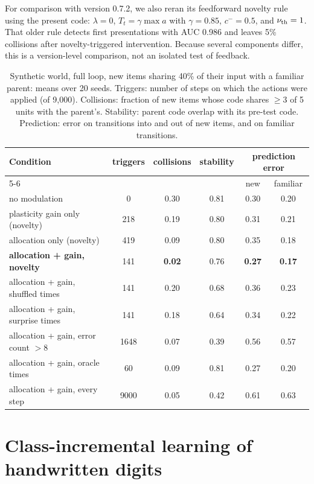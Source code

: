 \documentclass[11pt,a4paper]{article}
\begin{document}
For comparison with version 0.7.2, we also reran its feedforward novelty rule using the present code: $\lambda=0$, $T_t=\gamma\max a$ with $\gamma=0.85$, $c^-=0.5$, and $\nu_{\rm th}=1$. That older rule detects first presentations with AUC 0.986 and leaves 5\% collisions after novelty-triggered intervention. Because several components differ, this is a version-level comparison, not an isolated test of feedback.

\begin{table}[t]\small\centering
\caption{Synthetic world, full loop, new items sharing 40\% of their input with a familiar parent: means over 20 seeds. Triggers: number of steps on which the actions were applied (of 9{,}000). Collisions: fraction of new items whose code shares $\ge3$ of 5 units with the parent's. Stability: parent code overlap with its pre-test code. Prediction: error on transitions into and out of new items, and on familiar transitions.}\label{tab:toy}
\begin{tabular}{@{}lccccc@{}}
\toprule
Condition & triggers & collisions & stability & \multicolumn{2}{c}{prediction error} \\
\cmidrule(l){5-6}
 & & & & new & familiar \\
\midrule
no modulation & 0 & 0.30 & 0.81 & 0.30 & 0.20 \\
plasticity gain only (novelty) & 218 & 0.19 & 0.80 & 0.31 & 0.21 \\
allocation only (novelty) & 419 & 0.09 & 0.80 & 0.35 & 0.18 \\
\textbf{allocation + gain, novelty} & 141 & \textbf{0.02} & 0.76 & \textbf{0.27} & \textbf{0.17} \\
allocation + gain, shuffled times & 141 & 0.20 & 0.68 & 0.36 & 0.23 \\
allocation + gain, surprise times & 141 & 0.18 & 0.64 & 0.34 & 0.22 \\
allocation + gain, error count $>8$ & 1648 & 0.07 & 0.39 & 0.56 & 0.57 \\
allocation + gain, oracle times & 60 & 0.09 & 0.81 & 0.27 & 0.20 \\
allocation + gain, every step & 9000 & 0.05 & 0.42 & 0.61 & 0.63 \\
\bottomrule
\end{tabular}
\end{table}

\section{Class-incremental learning of handwritten digits}\label{sec:mnist}
\end{document}
